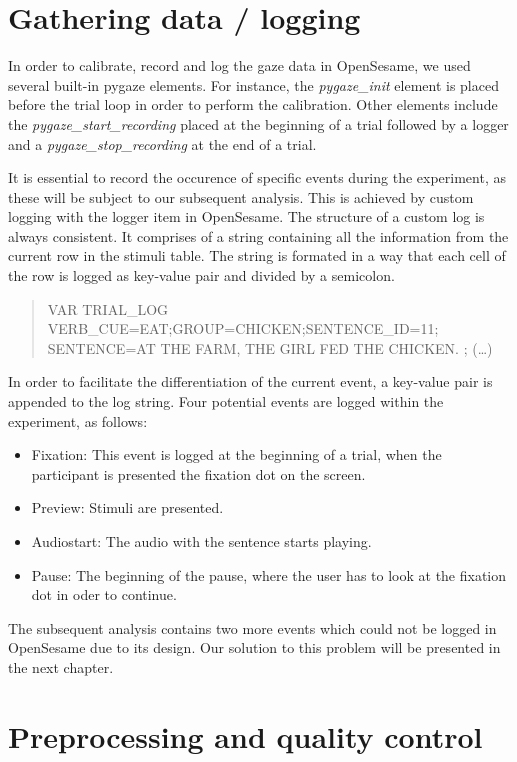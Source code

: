 \documentclass[
  12pt,
  letterpaper,
  DIV=11,
  numbers=noendperiod]{scrreprt}
\providecommand{\tightlist}{%
  \setlength{\itemsep}{0pt}\setlength{\parskip}{0pt}}\usepackage{longtable,booktabs,array}
\begin{document}
\section{Gathering data / logging}\label{sec-logging}

In order to calibrate, record and log the gaze data in OpenSesame, we
used several built-in pygaze elements. For instance, the
\emph{pygaze\_init} element is placed before the trial loop in order to
perform the calibration. Other elements include the
\emph{pygaze\_start\_recording} placed at the beginning of a trial
followed by a logger and a \emph{pygaze\_stop\_recording} at the end of
a trial.

It is essential to record the occurence of specific events during the
experiment, as these will be subject to our subsequent analysis. This is
achieved by custom logging with the logger item in OpenSesame. The
structure of a custom log is always consistent. It comprises of a string
containing all the information from the current row in the stimuli
table. The string is formated in a way that each cell of the row is
logged as key-value pair and divided by a semicolon.

\begin{quote}
VAR TRIAL\_LOG VERB\_CUE=EAT;GROUP=CHICKEN;SENTENCE\_ID=11; SENTENCE=AT
THE FARM, THE GIRL FED THE CHICKEN. ; (\ldots)
\end{quote}

In order to facilitate the differentiation of the current event, a
key-value pair is appended to the log string. Four potential events are
logged within the experiment, as follows:

\begin{itemize}
\tightlist
\item
  Fixation: This event is logged at the beginning of a trial, when the
  participant is presented the fixation dot on the screen.
\item
  Preview: Stimuli are presented.
\item
  Audiostart: The audio with the sentence starts playing.
\item
  Pause: The beginning of the pause, where the user has to look at the
  fixation dot in oder to continue.
\end{itemize}

The subsequent analysis contains two more events which could not be
logged in OpenSesame due to its design. Our solution to this problem
will be presented in the next chapter.

\section{Preprocessing and quality control}\label{sec-pre-quality}
\end{document}
